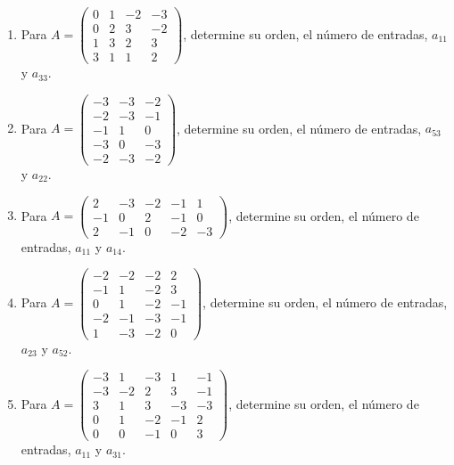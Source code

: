\documentclass[12pt]{article}
\theoremstyle{remark}
\newcounter{contadorEjercicio}
\newenvironment{listaejercicios}{\begin{enumerate}[label=\textbf{E\arabic*.},leftmargin=2.4em,itemsep=0.52em]\setcounter{enumi}{\value{contadorEjercicio}}}{\setcounter{contadorEjercicio}{\value{enumi}}\end{enumerate}}
\begin{document}
\begin{listaejercicios}
\item Para $A=\begin{pmatrix}0&1&-2&-3\\0&2&3&-2\\1&3&2&3\\3&1&1&2\end{pmatrix}$, determine su orden, el número de entradas, $a_{11}$ y $a_{33}$.

\item Para $A=\begin{pmatrix}-3&-3&-2\\-2&-3&-1\\-1&1&0\\-3&0&-3\\-2&-3&-2\end{pmatrix}$, determine su orden, el número de entradas, $a_{53}$ y $a_{22}$.

\item Para $A=\begin{pmatrix}2&-3&-2&-1&1\\-1&0&2&-1&0\\2&-1&0&-2&-3\end{pmatrix}$, determine su orden, el número de entradas, $a_{11}$ y $a_{14}$.

\item Para $A=\begin{pmatrix}-2&-2&-2&2\\-1&1&-2&3\\0&1&-2&-1\\-2&-1&-3&-1\\1&-3&-2&0\end{pmatrix}$, determine su orden, el número de entradas, $a_{23}$ y $a_{52}$.

\item Para $A=\begin{pmatrix}-3&1&-3&1&-1\\-3&-2&2&3&-1\\3&1&3&-3&-3\\0&1&-2&-1&2\\0&0&-1&0&3\end{pmatrix}$, determine su orden, el número de entradas, $a_{11}$ y $a_{31}$.

\end{listaejercicios}
\end{document}
